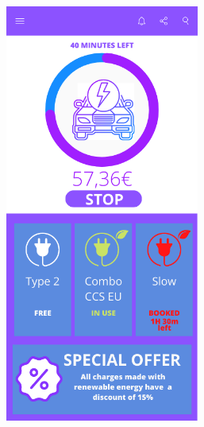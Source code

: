 \documentclass[12pt]{report}
\begin{document}
\begin{figure}[h]
\begin{subfigure}{0.49\textwidth}
        \includegraphics[width = 0.7\textwidth]{assets/ui3.png}
        \end{subfigure}
        \begin{subfigure}{0.49\textwidth}
        \centering

\end{subfigure}
\end{figure}
\end{document}
